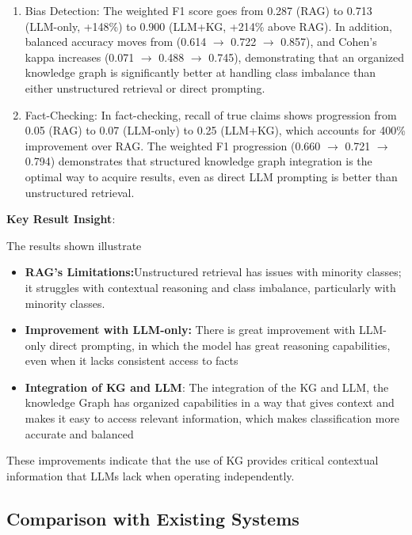 \documentclass[11pt]{article}
\begin{document}
\begin{enumerate}
  

\item{Bias Detection}: The weighted F1 score goes from 0.287 (RAG) to 0.713 (LLM-only, +148\%) to 0.900 (LLM+KG, +214\% above RAG). In addition, balanced accuracy moves from (0.614 $\rightarrow$ 0.722 $\rightarrow$ 0.857), and Cohen's kappa increases (0.071 $\rightarrow$ 0.488 $\rightarrow$ 0.745), demonstrating that an organized knowledge graph is significantly better at handling class imbalance than either unstructured retrieval or direct prompting.

\item{Fact-Checking}: In fact-checking, recall of true claims shows progression from 0.05 (RAG) to 0.07 (LLM-only) to 0.25 (LLM+KG), which accounts for 400\% improvement over RAG.  The weighted F1 progression (0.660 $\rightarrow$ 0.721 $\rightarrow$ 0.794) demonstrates that structured knowledge graph integration is the optimal way to acquire results, even as direct LLM prompting is better than unstructured retrieval.

\end{enumerate}
\textbf{Key Result Insight}:

The results shown illustrate

\begin{itemize}
    

\item \textbf{RAG's Limitations:}Unstructured retrieval has issues with minority classes; it struggles with contextual reasoning and class imbalance, particularly with minority classes.

\item \textbf{Improvement with LLM-only:} There is great improvement with LLM-only direct prompting, in which the model has  great reasoning capabilities, even when it lacks consistent access to facts

\item \textbf{Integration of KG and LLM}: The integration of the KG and LLM, the knowledge Graph has organized capabilities in a way that gives context and makes it easy to access relevant information, which makes classification more accurate and balanced
\end{itemize}

These improvements indicate that the use of KG provides critical contextual information that LLMs lack when operating independently.


\subsection{Comparison with Existing Systems}
\end{document}
